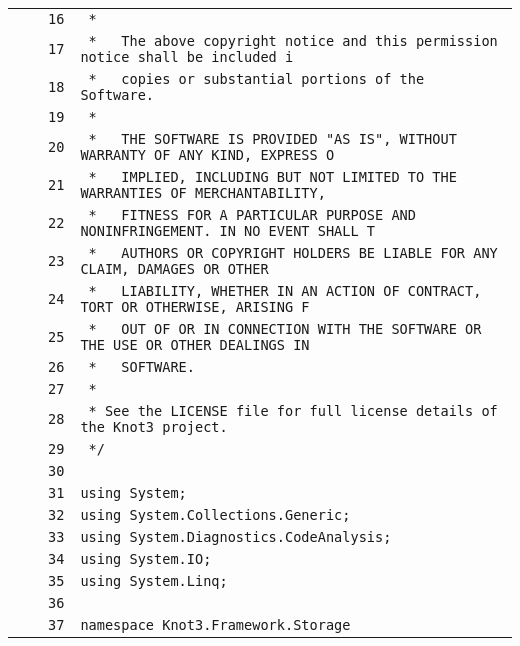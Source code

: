 \documentclass[a4paper,10pt]{article}
\begin{document}
\begin{longtable}[l]{lrrl}
\cellcolor{gray} &  & \verb~16~ & \verb~ *~\\
\cellcolor{gray} &  & \verb~17~ & \verb~ *   The above copyright notice and this permission notice shall be included i~\\
\cellcolor{gray} &  & \verb~18~ & \verb~ *   copies or substantial portions of the Software.~\\
\cellcolor{gray} &  & \verb~19~ & \verb~ *~\\
\cellcolor{gray} &  & \verb~20~ & \verb~ *   THE SOFTWARE IS PROVIDED "AS IS", WITHOUT WARRANTY OF ANY KIND, EXPRESS O~\\
\cellcolor{gray} &  & \verb~21~ & \verb~ *   IMPLIED, INCLUDING BUT NOT LIMITED TO THE WARRANTIES OF MERCHANTABILITY,~\\
\cellcolor{gray} &  & \verb~22~ & \verb~ *   FITNESS FOR A PARTICULAR PURPOSE AND NONINFRINGEMENT. IN NO EVENT SHALL T~\\
\cellcolor{gray} &  & \verb~23~ & \verb~ *   AUTHORS OR COPYRIGHT HOLDERS BE LIABLE FOR ANY CLAIM, DAMAGES OR OTHER~\\
\cellcolor{gray} &  & \verb~24~ & \verb~ *   LIABILITY, WHETHER IN AN ACTION OF CONTRACT, TORT OR OTHERWISE, ARISING F~\\
\cellcolor{gray} &  & \verb~25~ & \verb~ *   OUT OF OR IN CONNECTION WITH THE SOFTWARE OR THE USE OR OTHER DEALINGS IN~\\
\cellcolor{gray} &  & \verb~26~ & \verb~ *   SOFTWARE.~\\
\cellcolor{gray} &  & \verb~27~ & \verb~ *~\\
\cellcolor{gray} &  & \verb~28~ & \verb~ * See the LICENSE file for full license details of the Knot3 project.~\\
\cellcolor{gray} &  & \verb~29~ & \verb~ */~\\
\cellcolor{gray} &  & \verb~30~ & \verb~~\\
\cellcolor{gray} &  & \verb~31~ & \verb~using System;~\\
\cellcolor{gray} &  & \verb~32~ & \verb~using System.Collections.Generic;~\\
\cellcolor{gray} &  & \verb~33~ & \verb~using System.Diagnostics.CodeAnalysis;~\\
\cellcolor{gray} &  & \verb~34~ & \verb~using System.IO;~\\
\cellcolor{gray} &  & \verb~35~ & \verb~using System.Linq;~\\
\cellcolor{gray} &  & \verb~36~ & \verb~~\\
\cellcolor{gray} &  & \verb~37~ & \verb~namespace Knot3.Framework.Storage~\\

\end{longtable}
\end{document}
